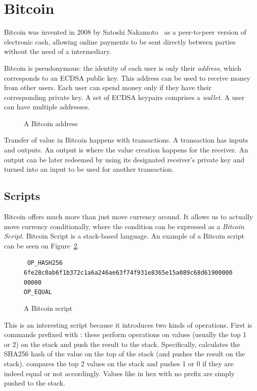 \section{Bitcoin}
Bitcoin was invented in 2008 by Satoshi Nakamoto~\cite{bitcoin} as a peer-to-peer version of electronic cash, allowing online payments to be sent directly between parties without the need of a intermediary.

Bitcoin is pseudonymous: the identity of each user is only their \emph{address}, which corresponds to an ECDSA public key. This address can be used to receive money from other users. Each user can spend money only if they have their corresponding private key. A set of ECDSA keypairs comprises a \emph{wallet}. A user can have multiple addresses.

\begin{figure}
  \centering
  \caption{A Bitcoin address}
  \label{fig:address-example}
\end{figure}

Transfer of value in Bitcoin happens with transactions. A transaction has inputs and outputs. An output is where the value creation happens for the receiver. An output can be later redeemed by using its designated receiver's private key and turned into an input to be used for another transaction.

\subsection{Scripts}
Bitcoin offers much more than just move currency around. It allows us to actually move currency conditionally, where the condition can be expressed as a \emph{Bitcoin Script}. Bitcoin Script is a stack-based language. An example of a Bitcoin script can be seen on Figure~\ref{fig:bitcoin-script}.

\begin{figure}
  \centering
  {
    \tt
    OP\_HASH256 \\
    6fe28c0ab6f1b372c1a6a246ae63f74f931e8365e15a089c68d6190000000000 \\
    OP\_EQUAL
  }
  \caption{A Bitcoin script}
  \label{fig:bitcoin-script}
\end{figure}

This is an interesting script because it introduces two kinds of operations. First is commands prefixed with : these perform operations on values (usually the top 1 or 2) on the stack and push the result to the stack. Specifically,  calculates the SHA256 hash of the value on the top of the stack (and pushes the result on the stack).  compares the top 2 values on the stack and pushes 1 or 0 if they are indeed equal or not accordingly. Values like  in hex with no  prefix are simply pushed to the stack.

